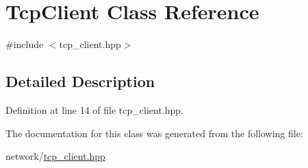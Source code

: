 \hypertarget{class_tcp_client}{}\section{Tcp\+Client Class Reference}
\label{class_tcp_client}


{\ttfamily \#include $<$tcp\+\_\+client.\+hpp$>$}



\subsection{Detailed Description}


Definition at line 14 of file tcp\+\_\+client.\+hpp.



The documentation for this class was generated from the following file\+:\begin{DoxyCompactItemize}
\item 
network/\mbox{\hyperlink{tcp__client_8hpp}{tcp\+\_\+client.\+hpp}}\end{DoxyCompactItemize}
